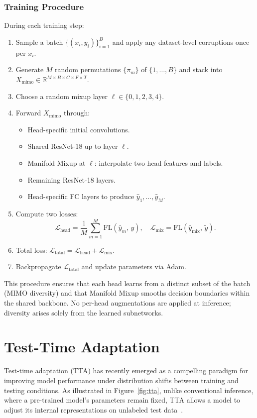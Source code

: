\subsubsection{Training Procedure}
During each training step:

\begin{enumerate}
  \item Sample a batch \(\{(x_i,y_i)\}_{i=1}^B\) and apply any dataset-level corruptions once per \(x_i\).  
  \item Generate \(M\) random permutations \(\{\pi_m\}\) of \(\{1,\dots,B\}\) and stack into \(X_{\mathrm{mimo}}\in\mathbb{R}^{M\times B\times C\times F\times T}\).  
  \item Choose a random mixup layer \(\ell\in\{0,1,2,3,4\}\).  
  \item Forward \(X_{\mathrm{mimo}}\) through:
    \begin{itemize}
      \item Head-specific initial convolutions.  
      \item Shared ResNet-18 up to layer \(\ell\).  
      \item Manifold Mixup at \(\ell\): interpolate two head features and labels.  
      \item Remaining ResNet-18 layers.  
      \item Head-specific FC layers to produce \(\hat y_1,\dots,\hat y_M\).  
    \end{itemize}
  \item Compute two losses:
    \[
      \mathcal{L}_{\mathrm{head}}
      = \frac1M\sum_{m=1}^M\mathrm{FL}(\hat y_m,\,y),
      \quad
      \mathcal{L}_{\mathrm{mix}}
      = \mathrm{FL}(\hat y_{\mathrm{mix}},\,\tilde y).
    \]
  \item Total loss: \(\mathcal{L}_{\mathrm{total}} = \mathcal{L}_{\mathrm{head}} + \mathcal{L}_{\mathrm{mix}}.\)  
  \item Backpropagate \(\mathcal{L}_{\mathrm{total}}\) and update parameters via Adam.
\end{enumerate}

\noindent
This procedure ensures that each head learns from a distinct subset of the batch (MIMO diversity) and that Manifold Mixup smooths decision boundaries within the shared backbone.  No per-head augmentations are applied at inference; diversity arises solely from the learned subnetworks.

\section{Test-Time Adaptation}
Test-time adaptation (TTA) has recently emerged as a compelling paradigm for improving model performance under distribution shifts between training and testing conditions. As illustrated in Figure~\ref{fig:tta}, unlike conventional inference, where a pre-trained model’s parameters remain fixed, TTA allows a model to adjust its internal representations on unlabeled test data~\cite{TTA}.


